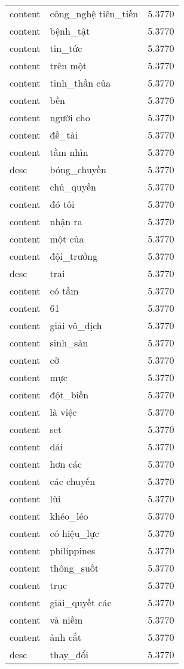 \documentclass{article}
\begin{document}
\begin{tabular}{lll}
content & công\_nghệ tiên\_tiến & 5.3770\\
content & bệnh\_tật & 5.3770\\
content & tin\_tức & 5.3770\\
content & trên một & 5.3770\\
content & tinh\_thần của & 5.3770\\
content & bền & 5.3770\\
content & người cho & 5.3770\\
content & đề\_tài & 5.3770\\
content & tầm nhìn & 5.3770\\
desc & bóng\_chuyền & 5.3770\\
content & chủ\_quyền & 5.3770\\
content & đó tôi & 5.3770\\
content & nhận ra & 5.3770\\
content & một của & 5.3770\\
content & đội\_trưởng & 5.3770\\
desc & trai & 5.3770\\
content & có tầm & 5.3770\\
content & 61 & 5.3770\\
content & giải vô\_địch & 5.3770\\
content & sinh\_sản & 5.3770\\
content & cỡ & 5.3770\\
content & mực & 5.3770\\
content & đột\_biến & 5.3770\\
content & là việc & 5.3770\\
content & set & 5.3770\\
content & dải & 5.3770\\
content & hơn các & 5.3770\\
content & các chuyến & 5.3770\\
content & lùi & 5.3770\\
content & khéo\_léo & 5.3770\\
content & có hiệu\_lực & 5.3770\\
content & philippines & 5.3770\\
content & thông\_suốt & 5.3770\\
content & trục & 5.3770\\
content & giải\_quyết các & 5.3770\\
content & và niềm & 5.3770\\
content & ảnh cắt & 5.3770\\
desc & thay\_đổi & 5.3770\\

\end{tabular}
\end{document}

